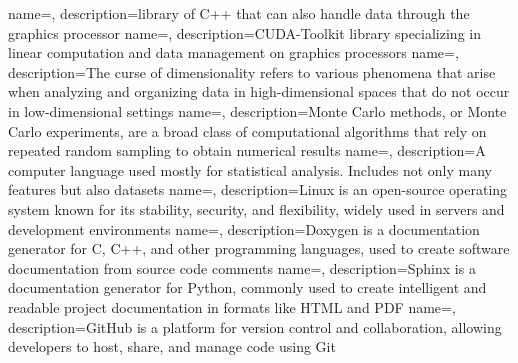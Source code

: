 {
    name=,
    description={library of C++ that can also handle data through the graphics processor}
}
{
    name=,
    description={CUDA-Toolkit library specializing in linear computation and data management on graphics processors}
}
{
name=,
description={The curse of dimensionality refers to various phenomena that arise when analyzing and organizing data in high-dimensional spaces that do not occur in low-dimensional settings}
}
{
	name=,
	description={Monte Carlo methods, or Monte Carlo experiments, are a broad class of computational algorithms that rely on repeated random sampling to obtain numerical results}
}
{
name=,
description={A computer language used mostly for statistical analysis. Includes not only many features but also datasets}
}
{
name=,
description={Linux is an open-source operating system known for its stability, security, and flexibility, widely used in servers and development environments}
}
{
name=,
description={Doxygen is a documentation generator for C, C++, and other programming languages, used to create software documentation from source code comments}
}
{
name=,
description={Sphinx is a documentation generator for Python, commonly used to create intelligent and readable project documentation in formats like HTML and PDF}
}
{
name=,
description={GitHub is a platform for version control and collaboration, allowing developers to host, share, and manage code using Git}
}






